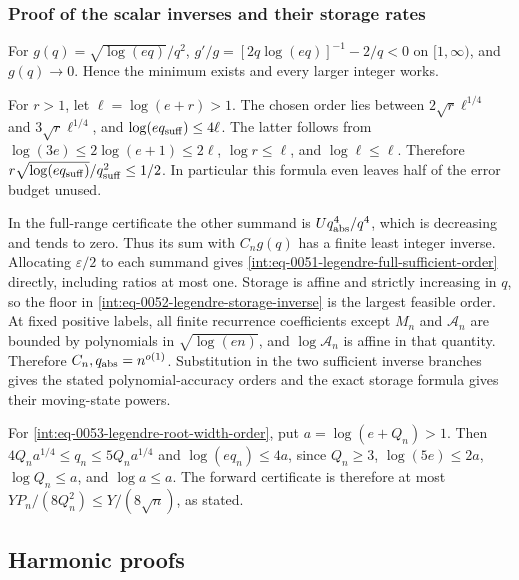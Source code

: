\subsubsection{Proof of the scalar inverses and their storage rates}
\label{int:legendre-inverse-proof}


For \(g(q)=\sqrt{\log(eq)}/q^2\), \(g'/g=[2q\log(eq)]^{-1}-2/q<0\) on \([1,\allowbreak \infty)\), and \(g(q)\to0\). Hence the minimum exists and every larger integer works.



For \(r>1\), let \(\ell=\log(e+r)>1\). The chosen order lies between \(2\sqrt r\ell^{1/4}\) and \(3\sqrt r\ell^{1/4}\), and \(\log(eq_{\rm suff})\le4\ell\). The latter follows from \(\log(3e)\le2\log(e+1)\le2\ell\), \(\log r\le\ell\), and \(\log\ell\le\ell\). Therefore \(r\sqrt{\log(eq_{\rm suff})}/q_{\rm suff}^2\le1/2\). In particular this formula even leaves half of the error budget unused.



In the full-range certificate the other summand is \(Uq_{\rm abs}^4/q^4\), which is decreasing and tends to zero. Thus its sum with \(C_ng(q)\) has a finite least integer inverse. Allocating \(\varepsilon/2\) to each summand gives \eqref{int:eq-0051-legendre-full-sufficient-order} directly, including ratios at most one. Storage is affine and strictly increasing in \(q\), so the floor in \eqref{int:eq-0052-legendre-storage-inverse} is the largest feasible order. At fixed positive labels, all finite recurrence coefficients except \(M_n\) and \(\mathcal A_n\) are bounded by polynomials in \(\sqrt{\log(en)}\), and \(\log\mathcal A_n\) is affine in that quantity. Therefore \(C_n,\allowbreak q_{\rm abs}=n^{o(1)}\). Substitution in the two sufficient inverse branches gives the stated polynomial-accuracy orders and the exact storage formula gives their moving-state powers.



For \eqref{int:eq-0053-legendre-root-width-order}, put \(a=\log(e+Q_n)>1\). Then \(4Q_na^{1/4}\le q_n\le5Q_na^{1/4}\) and \(\log(eq_n)\le4a\), since \(Q_n\ge3\), \(\log(5e)\le2a\), \(\log Q_n\le a\), and \(\log a\le a\). The forward certificate is therefore at most \(YP_n/(8Q_n^2)\le Y/(8\sqrt n)\), as stated.


\subsection{Harmonic proofs}
\label{int:compact-proofs}
\label{int:harmonic-proofs}

